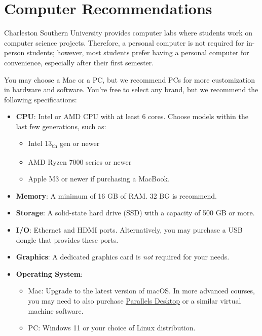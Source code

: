 \section{Computer Recommendations}
Charleston Southern University provides computer labs where students work on computer science projects. Therefore, a personal computer is not required for in-person students; however, most students prefer having a personal computer for convenience, especially after their first semester.

\vspace{1em}
You may choose a Mac or a PC, but we recommend PCs for more customization in hardware and software. You're free to select any brand, but we recommend the following specifications:

\begin{itemize}
    \item
        \textbf{CPU}: Intel or AMD CPU with at least 6 cores. Choose models within the last few generations, such as:
        \begin{itemize}
            \item Intel 13\textsubscript{th} gen or newer
            \item AMD Ryzen 7000 series or newer
            \item Apple M3 or newer if purchasing a MacBook.
        \end{itemize}
    \item
        \textbf{Memory}: A minimum of 16 GB of RAM\@. 32 BG is recommend.
    \item
        \textbf{Storage}: A solid-state hard drive (SSD) with a capacity of 500 GB or more.
    \item
        \textbf{I/O}: Ethernet and HDMI ports. Alternatively, you may purchase a USB dongle that provides these ports.
    \item
        \textbf{Graphics}: A dedicated graphics card is \emph{not} required for your needs.
    \item
        \textbf{Operating System}:
        \begin{itemize}
            \item {Mac}: Upgrade to the latest version of macOS\@. In more advanced courses, you may need to also purchase \href{https://www.parallels.com/products/desktop/}{Parallels Desktop} or a similar virtual machine software.
            \item {PC}: Windows 11 or your choice of Linux distribution.
        \end{itemize}
\end{itemize}